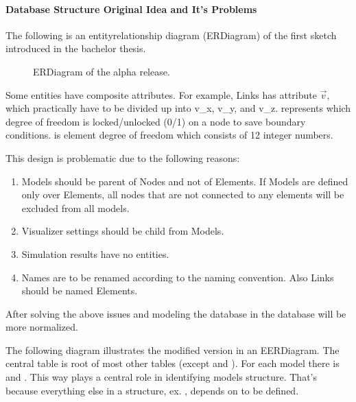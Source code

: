 \documentclass[letterpaper,10pt,english]{sphinxmanual}
\begin{document}
\paragraph{Database Structure \sphinxhyphen{} Original Idea and It’s Problems}
\label{\detokenize{implementation:database-structure-original-idea-and-it-s-problems}}
The following is an entity\sphinxhyphen{}relationship diagram (ER\sphinxhyphen{}Diagram) of the first sketch introduced in the bachelor thesis.

\begin{figure}[htbp]
\centering
\capstart

\noindent{}
\caption{ER\sphinxhyphen{}Diagram of the alpha release.}\label{\detokenize{implementation:id1}}\end{figure}

Some entities have composite attributes. For example, Links has attribute \(\vec{v}\), which practically
have to be divided up into v\_x, v\_y, and v\_z.
 represents which degree of freedom is locked/unlocked (0/1) on a node to save boundary conditions.
 is element degree of freedom which consists of 12 integer numbers.

This design is problematic due to the following reasons:
\begin{enumerate}
%
\item {} 
Models should be parent of Nodes and not of Elements. If Models are defined only over Elements, all nodes that are not connected to any elements will be excluded from all models.

\item {} 
Visualizer settings should be child from Models.

\item {} 
Simulation results have no entities.

\item {} 
Names are to be renamed according to the naming convention. Also Links should be named Elements.

\end{enumerate}

After solving the above issues and modeling the database in  the database
will be more normalized.

The following diagram illustrates the modified version in an EER\sphinxhyphen{}Diagram.
The central table  is root of most other tables (except  and ).
For each model there is  and . This way 
plays a central role in identifying models structure. That’s because everything else in a structure, ex. ,
depends on  to be defined.
\end{document}

